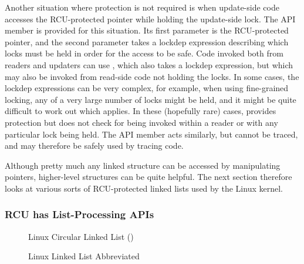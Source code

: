 Another situation where protection is not required is when update-side code
accesses the RCU-protected pointer while holding the update-side lock.
The  API member is provided for this
situation.
Its first parameter is the RCU-protected pointer, and the second
parameter takes a lockdep expression describing which locks must be
held in order for the access to be safe.
Code invoked both from readers and updaters can use
, which also takes a lockdep expression, but
which may also be invoked from read-side code not holding the locks.
In some cases, the lockdep expressions can be very complex, for example,
when using fine-grained locking, any of a very large number of locks
might be held, and it might be quite difficult to work out which applies.
In these (hopefully rare) cases,  provides
protection but does not check for being invoked within a reader or with
any particular lock being held.
The  API member acts similarly, but
cannot be traced, and may therefore be safely used by tracing code.

Although pretty much any linked structure can be accessed by manipulating
pointers, higher-level structures can be quite helpful.
The next section therefore looks at various sorts of RCU-protected
linked lists used by the Linux kernel.

\subsubsection{RCU has List-Processing APIs}
\label{sec:defer:RCU has List-Processing APIs}

\begin{figure}[tb]
\centering
{}
\caption{Linux Circular Linked List ()}
\label{fig:defer:Linux Circular Linked List (list)}
\end{figure}

\begin{figure}[tb]
\centering
{}
\caption{Linux Linked List Abbreviated}
\label{fig:defer:Linux Linked List Abbreviated}
\end{figure}

